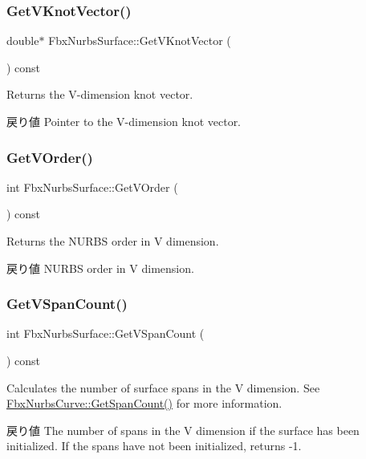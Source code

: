 \subsubsection{\texorpdfstring{Get\+V\+Knot\+Vector()}{GetVKnotVector()}}
{\footnotesize\ttfamily double$\ast$ Fbx\+Nurbs\+Surface\+::\+Get\+V\+Knot\+Vector (\begin{DoxyParamCaption}{ }\end{DoxyParamCaption}) const}

Returns the V-\/dimension knot vector. \begin{DoxyReturn}{戻り値}
Pointer to the V-\/dimension knot vector. 
\end{DoxyReturn}
\mbox{\label{class_fbx_nurbs_surface_a9727565bce4253b1d44e2fcd3a712f7b}} 
\subsubsection{\texorpdfstring{Get\+V\+Order()}{GetVOrder()}}
{\footnotesize\ttfamily int Fbx\+Nurbs\+Surface\+::\+Get\+V\+Order (\begin{DoxyParamCaption}{ }\end{DoxyParamCaption}) const}

Returns the N\+U\+R\+BS order in V dimension. \begin{DoxyReturn}{戻り値}
N\+U\+R\+BS order in V dimension. 
\end{DoxyReturn}
\mbox{\label{class_fbx_nurbs_surface_a7ced12d93b7736902f0ca7a8aa968f04}} 
\subsubsection{\texorpdfstring{Get\+V\+Span\+Count()}{GetVSpanCount()}}
{\footnotesize\ttfamily int Fbx\+Nurbs\+Surface\+::\+Get\+V\+Span\+Count (\begin{DoxyParamCaption}{ }\end{DoxyParamCaption}) const}

Calculates the number of surface spans in the V dimension. See \hyperlink{class_fbx_nurbs_curve_acb1cf2016f20b2a0c8df382046c7d3ea}{Fbx\+Nurbs\+Curve\+::\+Get\+Span\+Count()} for more information. \begin{DoxyReturn}{戻り値}
The number of spans in the V dimension if the surface has been initialized. If the spans have not been initialized, returns -\/1. 
\end{DoxyReturn}
\mbox{\label{class_fbx_nurbs_surface_aa5159d6706750fe43de222b7333b9b7a}} 
